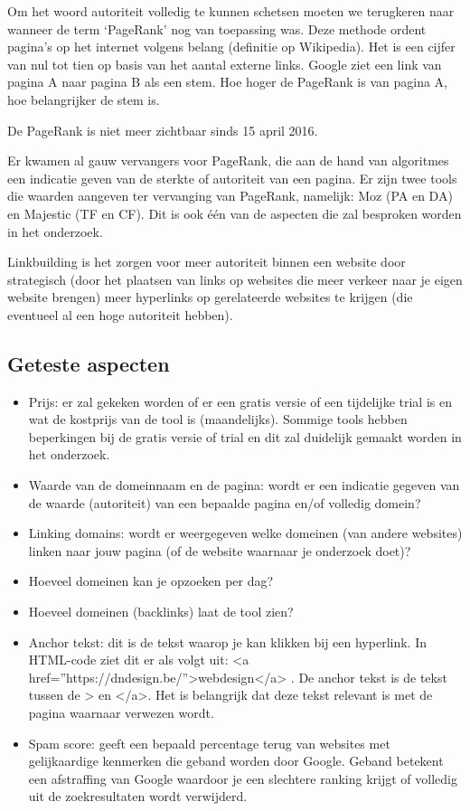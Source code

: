 Om het woord autoriteit volledig te kunnen schetsen moeten we terugkeren naar wanneer de term ‘PageRank’ nog van toepassing was. Deze methode ordent pagina’s op het internet volgens belang (definitie op Wikipedia). Het is een cijfer van nul tot tien op basis van het aantal externe links. Google ziet een link van pagina A naar pagina B als een stem. Hoe hoger de PageRank is van pagina A, hoe belangrijker de stem is. 

De PageRank is niet meer zichtbaar sinds 15 april 2016. 

Er kwamen al gauw vervangers voor PageRank, die aan de hand van algoritmes een indicatie geven van de sterkte of autoriteit van een pagina. Er zijn twee tools die waarden aangeven ter vervanging van PageRank, namelijk: Moz (PA en DA) en Majestic (TF en CF). Dit is ook één van de aspecten die zal besproken worden in het onderzoek. 

Linkbuilding is het zorgen voor meer autoriteit binnen een website door strategisch (door het plaatsen van links op websites die meer verkeer naar je eigen website brengen) meer hyperlinks op gerelateerde websites te krijgen (die eventueel al een hoge autoriteit hebben).

\subsection{Geteste aspecten}
\label{ch: Geteste aspecten}

\begin{itemize}
\item Prijs: er zal gekeken worden of er een gratis versie of een tijdelijke trial is en wat de kostprijs van de tool is (maandelijks). Sommige tools hebben beperkingen bij de gratis versie of trial en dit zal duidelijk gemaakt worden in het onderzoek.  
\item Waarde van de domeinnaam en de pagina: wordt er een indicatie gegeven van de waarde (autoriteit) van een bepaalde pagina en/of volledig domein? 
\item Linking domains: wordt er weergegeven welke domeinen (van andere websites) linken naar jouw pagina (of de website waarnaar je onderzoek doet)?
\item Hoeveel domeinen kan je opzoeken per dag?
\item Hoeveel domeinen (backlinks) laat de tool zien?
\item Anchor tekst: dit is de tekst waarop je kan klikken bij een hyperlink. In HTML-code ziet dit er als volgt uit: <a href=”https://dndesign.be/”>webdesign</a> . De anchor tekst is de tekst tussen de > en </a>. Het is belangrijk dat deze tekst relevant is met de pagina waarnaar verwezen wordt. 
\item Spam score: geeft een bepaald percentage terug van websites met gelijkaardige kenmerken die geband worden door Google. Geband betekent een afstraffing van Google waardoor je een slechtere ranking krijgt of volledig uit de zoekresultaten wordt verwijderd. 
\end{itemize}

